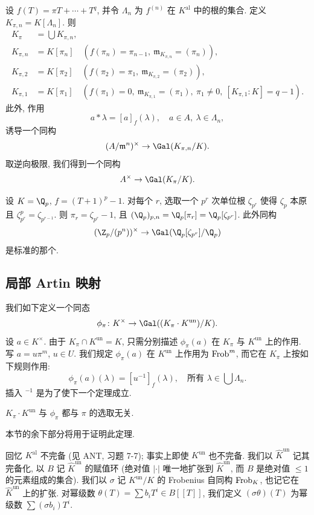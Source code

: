 \begin{summary}\label{note:3.7}
设 $f(T)=\pi T+\cdots+T^q$, 并令 $\Lambda_n$ 为 $f^{(n)}$ 在 $K^{\mathrm{al}}$ 中的根的集合. 定义 $K_{\pi,n}=K[\Lambda_n]$. 则
\[
\begin{aligned}
K_{\pi}&=\bigcup K_{\pi,n},\\
K_{\pi,n}&=K[\pi_n]\quad (f(\pi_n)=\pi_{n-1},\ \mathfrak{m}_{K_{\pi,n}}=(\pi_n)),\\
K_{\pi,2}&=K[\pi_2]\quad (f(\pi_2)=\pi_1,\ \mathfrak{m}_{K_{\pi,2}}=(\pi_2)),\\
K_{\pi,1}&=K[\pi_1]\quad (f(\pi_1)=0,\ \mathfrak{m}_{K_{\pi,1}}=(\pi_1),\ \pi_1\neq 0,\ [K_{\pi,1}:K]=q-1).
\end{aligned}
\]
此外, 作用
\[
a*\lambda=[a]_f(\lambda),\quad a\in A,\ \lambda\in\Lambda_n,
\]
诱导一个同构
\[
(A/\mathfrak{m}^n)^{\times}\to\Gal(K_{\pi,n}/K).
\]
取逆向极限, 我们得到一个同构
\[
A^{\times}\to\Gal(K_{\pi}/K).
\]
\end{summary}

\begin{example}\label{ex:3.8}
设 $K=\Q_p$, $f=(T+1)^p-1$. 对每个 $r$, 选取一个 $p^r$ 次单位根 $\zeta_{p^r}$ 使得 $\zeta_p$ 本原且 $\zeta_{p^r}^p=\zeta_{p^{r-1}}$. 则 $\pi_r=\zeta_{p^r}-1$, 且 $(\Q_p)_{p,n}=\Q_p[\pi_r]=\Q_p[\zeta_{p^r}]$. 此外同构
\[
(\Z_p/(p^n))^{\times}\to\Gal(\Q_p[\zeta_{p^r}]/\Q_p)
\]
是标准的那个.
\end{example}

\subsection*{局部 Artin 映射}

我们如下定义一个同态
\[
\phi_{\pi}\colon K^{\times}\to\Gal((K_{\pi}\cdot K^{\mathrm{un}})/K).
\]
设 $a\in K^{\times}$. 由于 $K_{\pi}\cap K^{\mathrm{un}}=K$, 只需分别描述 $\phi_{\pi}(a)$ 在 $K_{\pi}$ 与 $K^{\mathrm{un}}$ 上的作用. 写 $a=u\pi^m$, $u\in U$. 我们规定 $\phi_{\pi}(a)$ 在 $K^{\mathrm{un}}$ 上作用为 $\operatorname{Frob}^m$, 而它在 $K_{\pi}$ 上按如下规则作用:
\[
\phi_{\pi}(a)(\lambda)=[u^{-1}]_f(\lambda),\quad\text{所有 }\lambda\in\bigcup\Lambda_n.
\]
插入 ${}^{-1}$ 是为了使下一个定理成立.

\begin{theorem}\label{thm:3.9}
$K_{\pi}\cdot K^{\mathrm{un}}$ 与 $\phi_{\pi}$ 都与 $\pi$ 的选取无关.
\end{theorem}

本节的余下部分将用于证明此定理.

回忆 $K^{\mathrm{al}}$ 不完备 (见 ANT, 习题 7-7); 事实上即使 $K^{\mathrm{un}}$ 也不完备. 我们以 $\hat{K}^{\mathrm{un}}$ 记其完备化, 以 $B$ 记 $\hat{K}^{\mathrm{un}}$ 的赋值环 (绝对值 $|\cdot|$ 唯一地扩张到 $\hat{K}^{\mathrm{un}}$, 而 $B$ 是绝对值 $\le 1$ 的元素组成的集合). 我们以 $\sigma$ 记 $K^{\mathrm{un}}/K$ 的 Frobenius 自同构 $\operatorname{Frob}_K$, 也记它在 $\hat{K}^{\mathrm{un}}$ 上的扩张. 对幂级数 $\theta(T)=\sum b_i T^i\in B[[T]]$, 我们定义 $(\sigma\theta)(T)$ 为幂级数 $\sum(\sigma b_i)T^i$.

